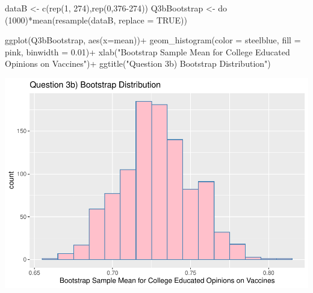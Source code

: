 \documentclass[
]{article}
\newenvironment{Shaded}{\begin{snugshade}}{\end{snugshade}}
\newcommand{\AttributeTok}[1]{\textcolor[rgb]{0.77,0.63,0.00}{#1}}
\newcommand{\ConstantTok}[1]{\textcolor[rgb]{0.00,0.00,0.00}{#1}}
\newcommand{\DecValTok}[1]{\textcolor[rgb]{0.00,0.00,0.81}{#1}}
\newcommand{\FloatTok}[1]{\textcolor[rgb]{0.00,0.00,0.81}{#1}}
\newcommand{\FunctionTok}[1]{\textcolor[rgb]{0.00,0.00,0.00}{#1}}
\newcommand{\NormalTok}[1]{#1}
\newcommand{\OtherTok}[1]{\textcolor[rgb]{0.56,0.35,0.01}{#1}}
\newcommand{\SpecialCharTok}[1]{\textcolor[rgb]{0.00,0.00,0.00}{#1}}
\newcommand{\StringTok}[1]{\textcolor[rgb]{0.31,0.60,0.02}{#1}}
\begin{document}
\begin{Shaded}
\begin{Highlighting}[]
\NormalTok{dataB }\OtherTok{\textless{}{-}} \FunctionTok{c}\NormalTok{(}\FunctionTok{rep}\NormalTok{(}\DecValTok{1}\NormalTok{, }\DecValTok{274}\NormalTok{),}\FunctionTok{rep}\NormalTok{(}\DecValTok{0}\NormalTok{,}\DecValTok{376{-}274}\NormalTok{))}
\NormalTok{Q3bBootstrap }\OtherTok{\textless{}{-}} \FunctionTok{do}\NormalTok{ (}\DecValTok{1000}\NormalTok{)}\SpecialCharTok{*}\FunctionTok{mean}\NormalTok{(}\FunctionTok{resample}\NormalTok{(dataB, }\AttributeTok{replace =} \ConstantTok{TRUE}\NormalTok{))}

\FunctionTok{ggplot}\NormalTok{(Q3bBootstrap, }\FunctionTok{aes}\NormalTok{(}\AttributeTok{x=}\NormalTok{mean))}\SpecialCharTok{+}
  \FunctionTok{geom\_histogram}\NormalTok{(}\AttributeTok{color =} \StringTok{\textquotesingle{}steelblue\textquotesingle{}}\NormalTok{, }\AttributeTok{fill =} \StringTok{\textquotesingle{}pink\textquotesingle{}}\NormalTok{, }\AttributeTok{binwidth =} \FloatTok{0.01}\NormalTok{)}\SpecialCharTok{+}
  \FunctionTok{xlab}\NormalTok{(}\StringTok{"Bootstrap Sample Mean for College Educated Opinions on Vaccines"}\NormalTok{)}\SpecialCharTok{+}
  \FunctionTok{ggtitle}\NormalTok{(}\StringTok{"Question 3b) Bootstrap Distribution"}\NormalTok{)}
\end{Highlighting}
\end{Shaded}

\includegraphics{Assignment2_files/figure-latex/Q3-2.pdf}
\end{document}
